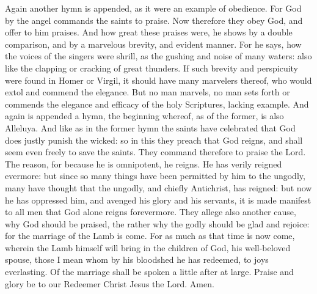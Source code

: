 Again another hymn is appended, as it were an example of obedience. For God by the angel commands the saints to praise. Now therefore they obey God, and offer to him praises. And how great these praises were, he shows by a double comparison, and by a marvelous brevity, and evident manner. For he says, how the voices of the singers were shrill, as the gushing and noise of many waters: also like the clapping or cracking of great thunders. If such brevity and perspicuity were found in Homer or Virgil, it should have many marvelers thereof, who would extol and commend the elegance. But no man marvels, no man sets forth or commends the elegance and efficacy of the holy Scriptures, lacking example. And again is appended a hymn, the beginning whereof, as of the former, is also Alleluya. And like as in the former hymn the saints have celebrated that God does justly punish the wicked: so in this they preach that God reigns, and shall seem even freely to save the saints. They command therefore to praise the Lord. The reason, for because he is omnipotent, he reigns. He has verily reigned evermore: but since so many things have been permitted by him to the ungodly, many have thought that the ungodly, and chiefly Antichrist, has reigned: but now he has oppressed him, and avenged his glory and his servants, it is made manifest to all men that God alone reigns forevermore. They allege also another cause, why God should be praised, the rather why the godly should be glad and rejoice: for the marriage of the Lamb is come. For as much as that time is now come, wherein the Lamb himself will bring in the children of God, his well-beloved spouse, those I mean whom by his bloodshed he has redeemed, to joys everlasting. Of the marriage shall be spoken a little after at large. Praise and glory be to our Redeemer Christ Jesus the Lord. Amen.
